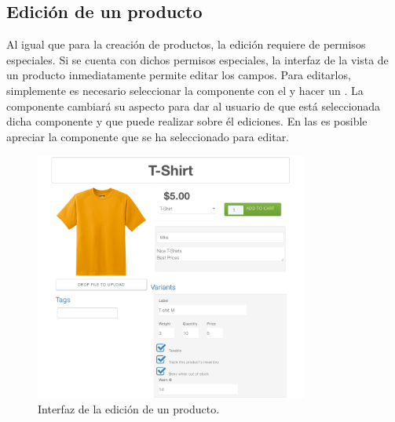 	\subsection{Edición de un producto}\label{chapter:section:productos:subsection:edicion}

		Al igual que para la creación de productos, la edición requiere de permisos especiales. Si se cuenta con dichos permisos especiales, la interfaz de la vista de un producto inmediatamente permite editar los campos. Para editarlos, simplemente es necesario seleccionar la componente con el \mousePC y hacer un \click. La componente cambiará su aspecto para dar \feedback al usuario de que está seleccionada dicha componente y que puede realizar sobre él ediciones. En las  es posible apreciar la componente que se ha seleccionado para editar.

		\begin{figure}[H]
			\centering
			\includegraphics[width=0.8\textwidth]{figuras/productos/details/write/main_menu.png}

			\caption{Interfaz de la edición de un producto.}
			\label{figure:productos:details:write:main_menu}
		\end{figure}

